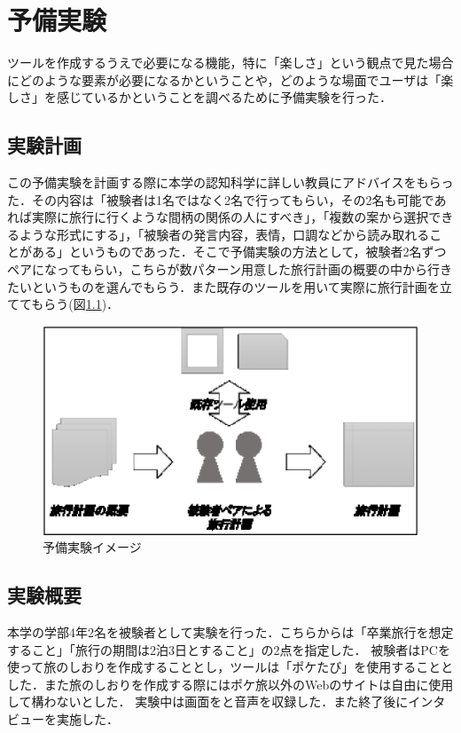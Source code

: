 \documentclass{funthesis}
\begin{document}
\chapter{予備実験}%
ツールを作成するうえで必要になる機能，特に「楽しさ」という観点で見た場合にどのような要素が必要になるかということや，どのような場面でユーザは「楽しさ」を感じているかということを調べるために予備実験を行った．

\section{実験計画}
この予備実験を計画する際に本学の認知科学に詳しい教員にアドバイスをもらった．その内容は「被験者は1名ではなく2名で行ってもらい，その2名も可能であれば実際に旅行に行くような間柄の関係の人にすべき」，「複数の案から選択できるような形式にする」，「被験者の発言内容，表情，口調などから読み取れることがある」というものであった．そこで予備実験の方法として，被験者2名ずつペアになってもらい，こちらが数パターン用意した旅行計画の概要の中から行きたいというものを選んでもらう．また既存のツールを用いて実際に旅行計画を立ててもらう(図\ref{Lsemiexp})．
\begin{figure}[htpb]
\begin{center}
\includegraphics[scale=0.4]{semiexp.eps}
\end{center}
\caption{予備実験イメージ}
\label{Lsemiexp}
\end{figure}


\section{実験概要}
本学の学部4年2名を被験者として実験を行った．こちらからは「卒業旅行を想定すること」「旅行の期間は2泊3日とすること」の2点を指定した．
被験者はPCを使って旅のしおりを作成することとし，ツールは「ポケたび」を使用することとした．また旅のしおりを作成する際にはポケ旅以外のWebのサイトは自由に使用して構わないとした．
実験中は画面をと音声を収録した．また終了後にインタビューを実施した．
\end{document}
